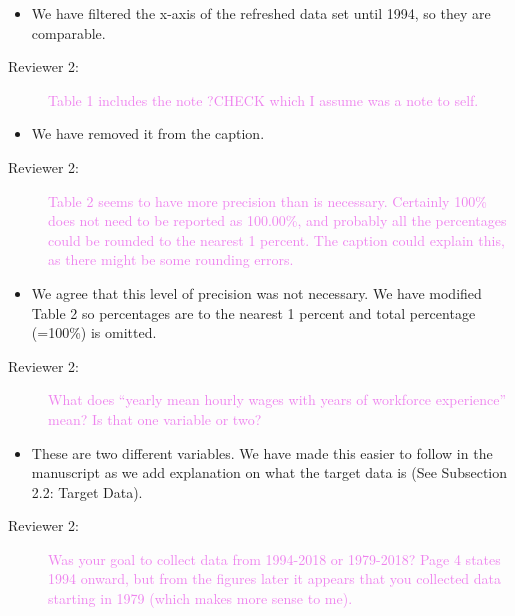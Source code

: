 \documentclass[12pt,a4paper,]{article}
\providecommand{\tightlist}{%
  \setlength{\itemsep}{0pt}\setlength{\parskip}{0pt}}
\begin{document}
\begin{itemize}
\tightlist
\item
  We have filtered the x-axis of the refreshed data set until 1994, so they are comparable.
\end{itemize}

\begin{description}
\item[Reviewer 2:]\textcolor{violet}{Table 1 includes the note ?CHECK which I assume was a note to self.}
\end{description}

\begin{itemize}
\tightlist
\item
  We have removed it from the caption.
\end{itemize}

\begin{description}
\item[Reviewer 2:]\textcolor{violet}{Table 2 seems to have more precision than is necessary. Certainly 100\% does not need to be reported as 100.00\%, and probably all the percentages could be rounded to the nearest 1 percent. The caption could explain this, as there might be some rounding errors.}
\end{description}

\begin{itemize}
\tightlist
\item
  We agree that this level of precision was not necessary. We have modified Table 2 so percentages are to the nearest 1 percent and total percentage (=100\%) is omitted.
\end{itemize}

\begin{description}
\item[Reviewer 2:]\textcolor{violet}{What does “yearly mean hourly wages with years of workforce experience” mean? Is that one variable or two?}
\end{description}

\begin{itemize}
\tightlist
\item
  These are two different variables. We have made this easier to follow in the manuscript as we add explanation on what the target data is (See Subsection 2.2: Target Data).
\end{itemize}

\begin{description}
\item[Reviewer 2:]\textcolor{violet}{Was your goal to collect data from 1994-2018 or 1979-2018? Page 4 states 1994 onward, but from the figures later it appears that you collected data starting in 1979 (which makes more sense to me).}
\end{description}
\end{document}
